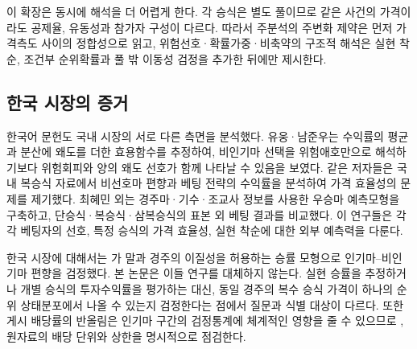 이 확장은 동시에 해석을 더 어렵게 한다. 각 승식은 별도 풀이므로 같은 사건의
가격이라도 공제율, 유동성과 참가자 구성이 다르다. 따라서 주분석의 주변화
제약은 먼저 가격측도 사이의 정합성으로 읽고, 위험선호·확률가중·비축약의
구조적 해석은 실현 착순, 조건부 순위확률과 풀 밖 이동성 검정을 추가한 뒤에만
제시한다.

\subsection{한국 시장의 증거}

한국어 문헌도 국내 시장의 서로 다른 측면을 분석했다.
유웅·남준우\citeyearpar{yoonam2015}는 수익률의
평균과 분산에 왜도를 더한 효용함수를 추정하여, 비인기마 선택을 위험애호만으로
해석하기보다 위험회피와 양의 왜도 선호가 함께 나타날 수 있음을 보였다.
같은 저자들\citeyearpar{yoonam2017}은 국내 복승식 자료에서 비선호마 편향과
베팅 전략의 수익률을 분석하여 가격 효율성의 문제를 제기했다.
최혜민 외\citeyearpar{choietal2015}는 경주마·기수·조교사 정보를 사용한 우승마
예측모형을 구축하고, 단승식·복승식·삼복승식의 표본 외 베팅 결과를 비교했다.
이 연구들은 각각 베팅자의 선호, 특정 승식의 가격 효율성, 실현 착순에 대한
외부 예측력을 다룬다.

한국 시장에 대해서는 \citet{jeongetal2019}가 말과 경주의 이질성을 허용하는
승률 모형으로 인기마--비인기마 편향을 검정했다. 본 논문은 이들 연구를 대체하지
않는다. 실현 승률을 추정하거나 개별 승식의 투자수익률을 평가하는 대신, 동일
경주의 복수 승식 가격이 하나의 순위 상태분포에서 나올 수 있는지 검정한다는
점에서 질문과 식별 대상이 다르다.
또한 게시 배당률의 반올림은 인기마 구간의 검정통계에 체계적인 영향을 줄 수
있으므로 \citep{wallsbusche2003}, 원자료의 배당 단위와 상한을 명시적으로
점검한다.
